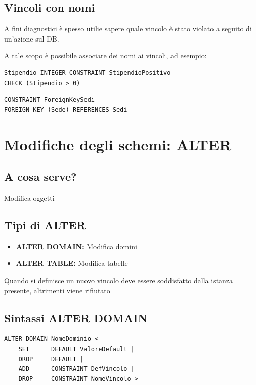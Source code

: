 \subsection{Vincoli con nomi}
A fini diagnostici è spesso utilie sapere quale vincolo è stato violato a seguito di un'azione sul DB.

A tale scopo è possibile associare dei nomi ai vincoli, ad esempio:
\begin{lstlisting}[language=sql_generic]
Stipendio INTEGER CONSTRAINT StipendioPositivo
CHECK (Stipendio > 0)
\end{lstlisting}
\begin{lstlisting}[language=sql_generic]
CONSTRAINT ForeignKeySedi
FOREIGN KEY (Sede) REFERENCES Sedi
\end{lstlisting}

\section{Modifiche degli schemi: ALTER}
\subsection{A cosa serve?}
Modifica oggetti

\subsection{Tipi di ALTER}
\begin{itemize}
    \item \textbf{ALTER DOMAIN:} Modifica domini
    \item \textbf{ALTER TABLE:} Modifica tabelle
\end{itemize}

Quando si definisce un nuovo vincolo deve essere soddisfatto dalla istanza presente, altrimenti viene rifiutato

\subsection{Sintassi ALTER DOMAIN}
\begin{lstlisting}[language=sql_generic]
ALTER DOMAIN NomeDominio <
    SET      DEFAULT ValoreDefault |
    DROP     DEFAULT |
    ADD      CONSTRAINT DefVincolo |
    DROP     CONSTRAINT NomeVincolo >
\end{lstlisting}

